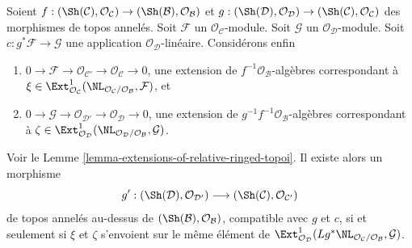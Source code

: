 \begin{lemma}
\label{lemma-extensions-of-relative-ringed-topoi-functorial}
Soient $f : (\Sh(\mathcal{C}), \mathcal{O}_\mathcal{C}) \to
(\Sh(\mathcal{B}), \mathcal{O}_\mathcal{B})$ et
$g : (\Sh(\mathcal{D}), \mathcal{O}_\mathcal{D}) \to
(\Sh(\mathcal{C}), \mathcal{O}_\mathcal{C})$ des morphismes de topos annelés.
Soit $\mathcal{F}$ un $\mathcal{O}_\mathcal{C}$-module.
Soit $\mathcal{G}$ un $\mathcal{O}_\mathcal{D}$-module. Soit
$c : g^*\mathcal{F} \to \mathcal{G}$ une application
$\mathcal{O}_\mathcal{D}$-linéaire. Considérons enfin
\begin{enumerate}
\item[(a)]
$0 \to \mathcal{F} \to \mathcal{O}_{\mathcal{C}'} \to
\mathcal{O}_\mathcal{C} \to 0$, une extension de
$f^{-1}\mathcal{O}_\mathcal{B}$-algèbres correspondant à
$\xi \in \Ext^1_{\mathcal{O}_\mathcal{C}}(
\NL_{\mathcal{O}_\mathcal{C}/\mathcal{O}_\mathcal{B}}, \mathcal{F})$, et
\item[(b)]
$0 \to \mathcal{G} \to \mathcal{O}_{\mathcal{D}'} \to
\mathcal{O}_\mathcal{D} \to 0$, une extension de
$g^{-1}f^{-1}\mathcal{O}_\mathcal{B}$-algèbres correspondant à
$\zeta \in \Ext^1_{\mathcal{O}_\mathcal{D}}(
\NL_{\mathcal{O}_\mathcal{D}/\mathcal{O}_\mathcal{B}}, \mathcal{G})$.
\end{enumerate}
Voir le Lemme \ref{lemma-extensions-of-relative-ringed-topoi}.
Il existe alors un morphisme
$$
g' :
(\Sh(\mathcal{D}), \mathcal{O}_{\mathcal{D}'})
\longrightarrow
(\Sh(\mathcal{C}), \mathcal{O}_{\mathcal{C}'})
$$
de topos annelés au-dessus de
$(\Sh(\mathcal{B}), \mathcal{O}_\mathcal{B})$, compatible avec $g$ et $c$, si
et seulement si $\xi$ et $\zeta$ s'envoient sur le même élément de
$\Ext^1_{\mathcal{O}_\mathcal{D}}(
Lg^*\NL_{\mathcal{O}_\mathcal{C}/\mathcal{O}_\mathcal{B}}, \mathcal{G})$.
\end{lemma}

